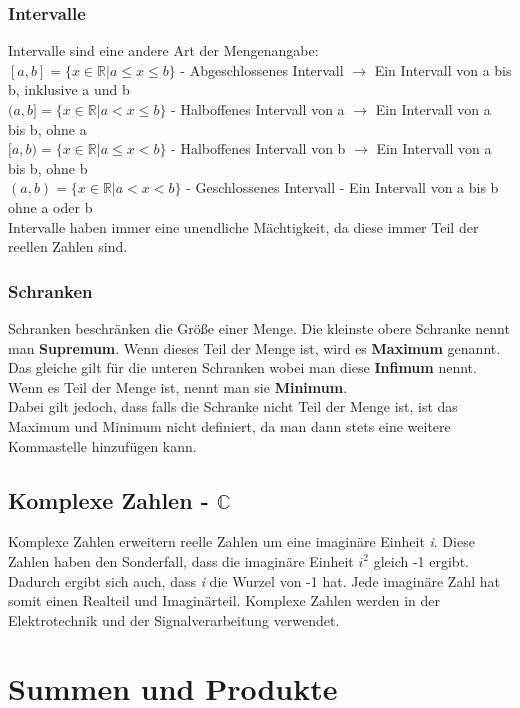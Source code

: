 \documentclass{article}
\newcommand{\R}{\mathbb{R}}
\begin{document}
	\subsubsection{Intervalle}
	Intervalle sind eine andere Art der Mengenangabe: \\
	$[a,b] = \{x\in \R | a \leq x \leq b\}$ - Abgeschlossenes Intervall $\to$ Ein Intervall von a bis b, inklusive a und b \\
	$(a,b] = \{x \in \R | a < x \leq b \}$ - Halboffenes Intervall von a $\to$ Ein Intervall von a bis b, ohne a \\
	$[a,b) = \{x\in \R | a \leq x < b \}$ - Halboffenes Intervall von b $\to$ Ein Intervall von a bis b, ohne b \\
	$(a,b) = \{x \in \R | a < x < b \}$ - Geschlossenes Intervall - Ein Intervall von a bis b ohne a oder b \\
	Intervalle haben immer eine unendliche Mächtigkeit, da diese immer Teil der reellen Zahlen sind.
	\subsubsection{Schranken}
	Schranken beschränken die Größe einer Menge. Die kleinste obere Schranke nennt man \textbf{Supremum}. Wenn dieses Teil der Menge ist, wird es \textbf{Maximum} genannt.\\
	Das gleiche gilt für die unteren Schranken wobei man diese \textbf{Infimum} nennt. Wenn es Teil der Menge ist, nennt man sie \textbf{Minimum}. \\
	Dabei gilt jedoch, dass falls die Schranke nicht Teil der Menge ist, ist das Maximum und Minimum nicht definiert, da man dann stets eine weitere Kommastelle hinzufügen kann.
	\subsection{Komplexe Zahlen - \texorpdfstring{$\mathbb{C}$}{}}
	Komplexe Zahlen erweitern reelle Zahlen um eine imaginäre Einheit \textit{i}. Diese Zahlen haben den Sonderfall, dass die imaginäre Einheit $i^2$ gleich -1 ergibt. Dadurch ergibt sich auch, dass \textit{i} die Wurzel von -1 hat. Jede imaginäre Zahl hat somit einen Realteil und Imaginärteil. Komplexe Zahlen werden in der Elektrotechnik und der Signalverarbeitung verwendet.
	\section{Summen und Produkte}
\end{document}
